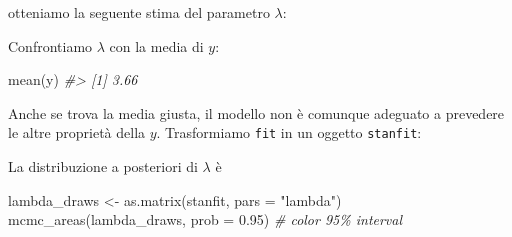 \documentclass[
  10pt,
  italian,
  a4paper,
  extrafontsizes,onecolumn,openright
  ]{memoir}
\newenvironment{Shaded}{\begin{snugshade}}{\end{snugshade}}
\newcommand{\AttributeTok}[1]{\textcolor[rgb]{0.77,0.63,0.00}{#1}}
\newcommand{\CommentTok}[1]{\textcolor[rgb]{0.56,0.35,0.01}{\textit{#1}}}
\newcommand{\FloatTok}[1]{\textcolor[rgb]{0.00,0.00,0.81}{#1}}
\newcommand{\FunctionTok}[1]{\textcolor[rgb]{0.00,0.00,0.00}{#1}}
\newcommand{\NormalTok}[1]{#1}
\newcommand{\OtherTok}[1]{\textcolor[rgb]{0.56,0.35,0.01}{#1}}
\newcommand{\SpecialCharTok}[1]{\textcolor[rgb]{0.00,0.00,0.00}{#1}}
\newcommand{\StringTok}[1]{\textcolor[rgb]{0.31,0.60,0.02}{#1}}
\begin{document}
\noindent
otteniamo la seguente stima del parametro \(\lambda\):

\begin{Shaded}
\end{Shaded}

\noindent
Confrontiamo \(\lambda\) con la media di \(y\):

\begin{Shaded}
\begin{Highlighting}[]
\FunctionTok{mean}\NormalTok{(y)}
\CommentTok{\#\textgreater{} [1] 3.66}
\end{Highlighting}
\end{Shaded}

Anche se trova la media giusta, il modello non è comunque adeguato a prevedere le altre proprietà della \(y\). Trasformiamo \texttt{fit} in un oggetto \texttt{stanfit}:

\begin{Shaded}
\end{Shaded}

\noindent
La distribuzione a posteriori di \(\lambda\) è

\begin{Shaded}
\begin{Highlighting}[]
\NormalTok{lambda\_draws }\OtherTok{\textless{}{-}} \FunctionTok{as.matrix}\NormalTok{(stanfit, }\AttributeTok{pars =} \StringTok{"lambda"}\NormalTok{)}
\FunctionTok{mcmc\_areas}\NormalTok{(lambda\_draws, }\AttributeTok{prob =} \FloatTok{0.95}\NormalTok{) }\CommentTok{\# color 95\% interval}
\end{Highlighting}
\end{Shaded}
\end{document}
